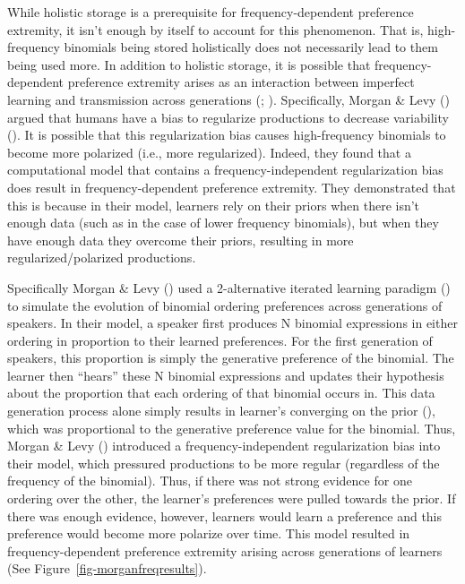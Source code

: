 \documentclass[
  12pt,
]{scrartcl}
\begin{document}
While holistic storage is a prerequisite for frequency-dependent
preference extremity, it isn't enough by itself to account for this
phenomenon. That is, high-frequency binomials being stored holistically
does not necessarily lead to them being used more. In addition to
holistic storage, it is possible that frequency-dependent preference
extremity arises as an interaction between imperfect learning and
transmission across generations
(;
). Specifically, Morgan \& Levy
()
argued that humans have a bias to regularize productions to decrease
variability
(). It is possible that this regularization bias
causes high-frequency binomials to become more polarized (i.e., more
regularized). Indeed, they found that a computational model that
contains a frequency-independent regularization bias does result in
frequency-dependent preference extremity. They demonstrated that this is
because in their model, learners rely on their priors when there isn't
enough data (such as in the case of lower frequency binomials), but when
they have enough data they overcome their priors, resulting in more
regularized/polarized productions.

Specifically Morgan \& Levy
()
used a 2-alternative iterated learning paradigm
() to simulate the evolution of binomial ordering
preferences across generations of speakers. In their model, a speaker
first produces N binomial expressions in either ordering in proportion
to their learned preferences. For the first generation of speakers, this
proportion is simply the generative preference of the binomial. The
learner then ``hears'' these N binomial expressions and updates their
hypothesis about the proportion that each ordering of that binomial
occurs in. This data generation process alone simply results in
learner's converging on the prior
(), which was proportional to the generative preference
value for the binomial. Thus, Morgan \& Levy
()
introduced a frequency-independent regularization bias into their model,
which pressured productions to be more regular (regardless of the
frequency of the binomial). Thus, if there was not strong evidence for
one ordering over the other, the learner's preferences were pulled
towards the prior. If there was enough evidence, however, learners would
learn a preference and this preference would become more polarize over
time. This model resulted in frequency-dependent preference extremity
arising across generations of learners (See
Figure~\ref{fig-morganfreqresults}).
\end{document}
